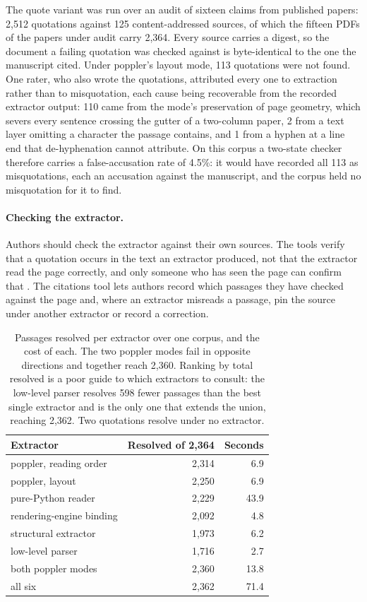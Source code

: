 \documentclass{article}
\begin{document}
The quote variant was run over an audit of sixteen claims from published papers:
2{,}512 quotations against 125 content-addressed sources, of which the fifteen PDFs of the papers
under audit carry 2{,}364. Every source carries a digest, so the document a failing quotation was
checked against is byte-identical to the one the manuscript cited. Under poppler's layout mode,
113 quotations were not found. One rater, who also wrote the quotations, attributed every one to
extraction rather than to misquotation, each cause being recoverable from the recorded extractor
output: 110 came from the mode's preservation of page geometry, which severs every sentence
crossing the gutter of a two-column paper, 2 from a text layer omitting a character the passage contains, and 1 from a
hyphen at a line end that de-hyphenation cannot attribute. On this corpus a two-state checker therefore carries a false-accusation rate of 4.5\%: it would
have recorded all 113 as misquotations, each an accusation against the manuscript, and the corpus
held no misquotation for it to find.

\paragraph{Checking the extractor.} Authors should check the extractor against their own sources.
The tools verify that a quotation occurs in the text an extractor produced, not that the extractor
read the page correctly, and only someone who has seen the page can confirm that
\citep{wagenknecht2014opaque}. The citations tool lets authors record which passages they have
checked against the page and, where an extractor misreads a passage, pin the source under another
extractor or record a correction.

\begin{table}[H]
\centering
\small
\caption{Passages resolved per extractor over one corpus, and the cost of each. The two poppler
modes fail in opposite directions and together reach 2{,}360. Ranking by total resolved is a poor
guide to which extractors to consult: the low-level parser resolves 598 fewer passages than the
best single extractor and is the only one that extends the union, reaching 2{,}362. Two quotations
resolve under no extractor.}
\label{tab:readers}
\begin{tabular}{@{}lrr@{}}
\toprule
\textbf{Extractor} & \textbf{Resolved of 2{,}364} & \textbf{Seconds} \\
\midrule
poppler, reading order & 2{,}314 & 6.9 \\
poppler, layout & 2{,}250 & 6.9 \\
pure-Python reader & 2{,}229 & 43.9 \\
rendering-engine binding & 2{,}092 & 4.8 \\
structural extractor & 1{,}973 & 6.2 \\
low-level parser & 1{,}716 & 2.7 \\
\midrule
both poppler modes & 2{,}360 & 13.8 \\
all six & 2{,}362 & 71.4 \\
\bottomrule
\end{tabular}
\end{table}
\end{document}
